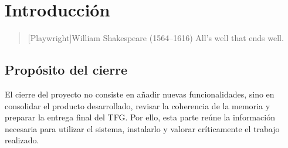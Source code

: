\chapter{Introducción}

\begin{quotation}[Playwright]{William Shakespeare (1564--1616)}
All’s well that ends well.
\end{quotation}

\begin{abstract}
Esta parte recoge el cierre del proyecto desde el punto de vista documental y operativo.
Se incluyen los materiales de uso e instalación, junto con la reflexión final sobre el
resultado obtenido y las posibles líneas de continuidad del trabajo.
\end{abstract}

\section{Propósito del cierre}
El cierre del proyecto no consiste en añadir nuevas funcionalidades, sino en consolidar el
producto desarrollado, revisar la coherencia de la memoria y preparar la entrega final del
TFG. Por ello, esta parte reúne la información necesaria para utilizar el sistema,
instalarlo y valorar críticamente el trabajo realizado.
